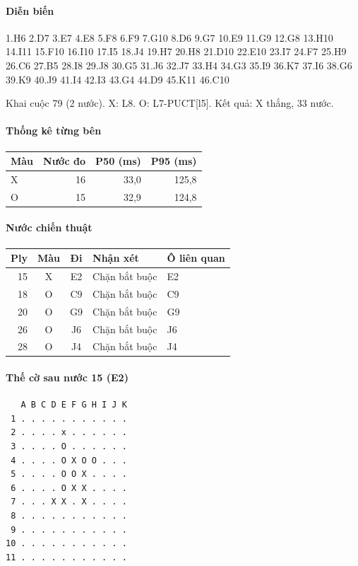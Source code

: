 \paragraph{Diễn biến}
{\footnotesize 1.H6 2.D7 3.E7 4.E8 5.F8 6.F9 7.G10 8.D6 9.G7 10.E9 11.G9 12.G8 13.H10 14.I11 15.F10 16.I10 17.I5 18.J4 19.H7 20.H8 21.D10 22.E10 23.I7 24.F7 25.H9 26.C6 27.B5 28.I8 29.J8 30.G5 31.J6 32.J7 33.H4 34.G3 35.I9 36.K7 37.I6 38.G6 39.K9 40.J9 41.I4 42.I3 43.G4 44.D9 45.K11 46.C10\par}
Khai cuộc 79 (2 nước). X: L8. O: L7-PUCT[l5]. Kết quả: X thắng, 33 nước.
\paragraph{Thống kê từng bên}
\begin{center}\small
\begin{tabular}{@{}lrrr@{}}
\toprule
Màu & Nước đo & P50 (ms) & P95 (ms) \\
\midrule
X & 16 & 33,0 & 125,8 \\
O & 15 & 32,9 & 124,8 \\
\bottomrule
\end{tabular}
\end{center}
\paragraph{Nước chiến thuật}
\begin{center}\small
\begin{tabular}{@{}rccll@{}}
\toprule
Ply & Màu & Đi & Nhận xét & Ô liên quan \\
\midrule
15 & X & E2 & Chặn bắt buộc & E2 \\
18 & O & C9 & Chặn bắt buộc & C9 \\
20 & O & G9 & Chặn bắt buộc & G9 \\
26 & O & J6 & Chặn bắt buộc & J6 \\
28 & O & J4 & Chặn bắt buộc & J4 \\
\bottomrule
\end{tabular}
\end{center}
\paragraph{Thế cờ sau nước 15 (E2)}
\begin{verbatim}
   A B C D E F G H I J K
 1 . . . . . . . . . . .
 2 . . . . x . . . . . .
 3 . . . . O . . . . . .
 4 . . . . O X O O . . .
 5 . . . . O O X . . . .
 6 . . . . O X X . . . .
 7 . . . X X . X . . . .
 8 . . . . . . . . . . .
 9 . . . . . . . . . . .
10 . . . . . . . . . . .
11 . . . . . . . . . . .
\end{verbatim}
